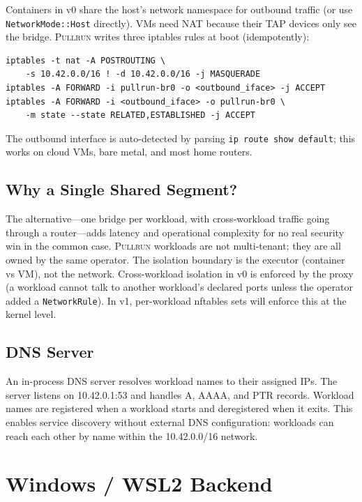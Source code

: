 \documentclass[11pt,a4paper]{article}
\newcommand{\pullrun}{\textsc{Pullrun}}
\begin{document}
Containers in v0 share the host's network namespace for outbound traffic (or use \texttt{NetworkMode::Host} directly). VMs need NAT because their TAP devices only see the bridge. \pullrun{} writes three iptables rules at boot (idempotently):

\begin{verbatim}
iptables -t nat -A POSTROUTING \
    -s 10.42.0.0/16 ! -d 10.42.0.0/16 -j MASQUERADE
iptables -A FORWARD -i pullrun-br0 -o <outbound_iface> -j ACCEPT
iptables -A FORWARD -i <outbound_iface> -o pullrun-br0 \
    -m state --state RELATED,ESTABLISHED -j ACCEPT
\end{verbatim}

The outbound interface is auto-detected by parsing \texttt{ip route show default}; this works on cloud VMs, bare metal, and most home routers.

\subsection{Why a Single Shared Segment?}

The alternative---one bridge per workload, with cross-workload traffic going through a router---adds latency and operational complexity for no real security win in the common case. \pullrun{} workloads are not multi-tenant; they are all owned by the same operator. The isolation boundary is the executor (container vs VM), not the network. Cross-workload isolation in v0 is enforced by the proxy (a workload cannot talk to another workload's declared ports unless the operator added a \texttt{NetworkRule}). In v1, per-workload nftables sets will enforce this at the kernel level.

\subsection{DNS Server}

An in-process DNS server resolves workload names to their assigned IPs. The server listens on 10.42.0.1:53 and handles A, AAAA, and PTR records. Workload names are registered when a workload starts and deregistered when it exits. This enables service discovery without external DNS configuration: workloads can reach each other by name within the 10.42.0.0/16 network.



\section{Windows / WSL2 Backend}\label{sec:windows}
\end{document}
